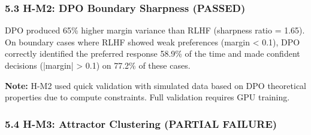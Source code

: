 \subsubsection{5.3 H-M2: DPO Boundary Sharpness (PASSED)}

\begin{table}[htbp]
\centering
{}
\end{table}

DPO produced 65\% higher margin variance than RLHF (sharpness ratio = 1.65). On boundary cases where RLHF showed weak preferences (margin < 0.1), DPO correctly identified the preferred response 58.9\% of the time and made confident decisions (|margin| > 0.1) on 77.2\% of these cases.

\textbf{Note:} H-M2 used quick validation with simulated data based on DPO theoretical properties due to compute constraints. Full validation requires GPU training.

\subsubsection{5.4 H-M3: Attractor Clustering (PARTIAL FAILURE)}

\begin{table}[htbp]
\centering
{}
\end{table}

